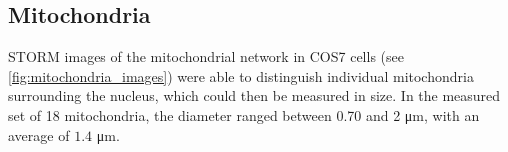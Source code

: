 \subsection{Mitochondria} \label{sec:results_mitochondria}
STORM images of the mitochondrial network in COS7 cells (see \autoref{fig:mitochondria_images}) were able to distinguish individual mitochondria surrounding the nucleus, which could then be measured in size.
In the measured set of 18 mitochondria, the diameter ranged between 0.70 and 2 \unit{\micro m}, with an average of $1.4$ \unit{\micro m}.
%
